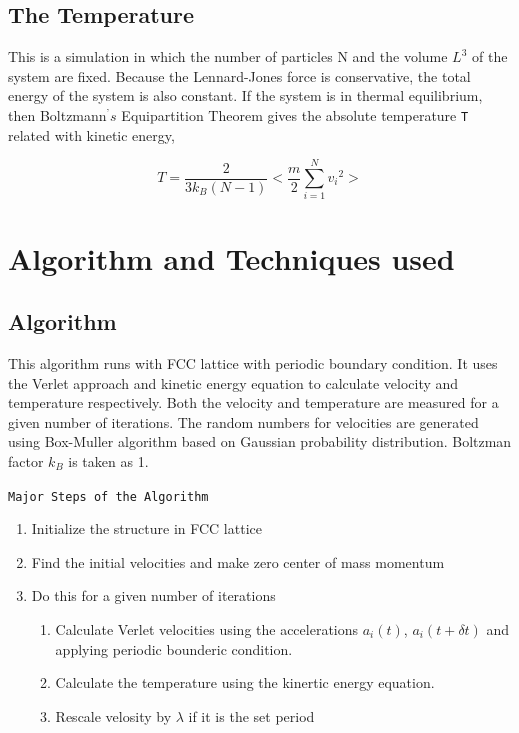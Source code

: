 \documentclass[]{article}
\begin{document}
\subsection{\label{sec:level1.3} The Temperature}
This is a simulation in which the number of particles N and the volume $L^3$ of the system are fixed. Because the Lennard-Jones force is conservative, the total energy of the system is also constant.
If the system is in thermal equilibrium, then Boltzmann$^’s$ Equipartition Theorem gives the absolute temperature \texttt{T} related with kinetic energy,

\begin{equation}
\label{eq:ss3}
T = \frac{2}{3k_B(N-1)}<\frac{m}{2} \sum_{i=1}^N{{v_i}^2}> 
\end{equation}


\section{Algorithm and Techniques used}

\subsection{\label{sec:level2.1}  Algorithm}
This algorithm runs with FCC lattice with periodic boundary condition. It uses the Verlet approach and kinetic energy equation to calculate velocity and temperature respectively. Both the velocity and temperature are measured for a given number of iterations. The random numbers for velocities are generated using Box-Muller algorithm based on Gaussian probability distribution. Boltzman factor $k_B$ is taken as 1.

\texttt{Major Steps of the Algorithm}
\begin{enumerate}
\item Initialize the structure in FCC lattice
\item Find the initial velocities and make zero center of mass momentum
\item Do this for a given number of iterations
\begin{enumerate}
    \item Calculate Verlet velocities using the accelerations $a_i(t)$, $a_i(t+\delta t)$ and applying periodic bounderic condition.
    \item Calculate the temperature using the kinertic energy equation.
    \item Rescale velosity by $\lambda$ if it is the set period
\end{enumerate}

\end{enumerate}
\end{document}
